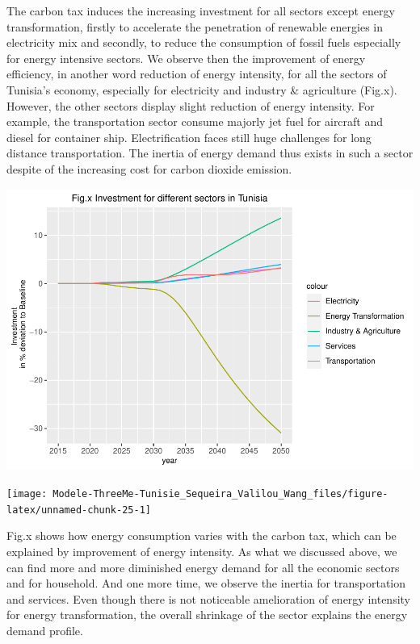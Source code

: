 \documentclass[
]{article}
\begin{document}
The carbon tax induces the increasing investment for all sectors except
energy transformation, firstly to accelerate the penetration of
renewable energies in electricity mix and secondly, to reduce the
consumption of fossil fuels especially for energy intensive sectors. We
observe then the improvement of energy efficiency, in another word
reduction of energy intensity, for all the sectors of Tunisia's economy,
especially for electricity and industry \& agriculture (Fig.x). However,
the other sectors display slight reduction of energy intensity. For
example, the transportation sector consume majorly jet fuel for aircraft
and diesel for container ship. Electrification faces still huge
challenges for long distance transportation. The inertia of energy
demand thus exists in such a sector despite of the increasing cost for
carbon dioxide emission.

\begin{center}\includegraphics[width=0.7\linewidth,height=0.7\textheight]{Modele-ThreeMe-Tunisie_Sequeira_Valilou_Wang_files/figure-latex/unnamed-chunk-24-1} \end{center}

\begin{center}\texttt{[image: Modele-ThreeMe-Tunisie\_Sequeira\_Valilou\_Wang\_files/figure-latex/unnamed-chunk-25-1]} \end{center}

Fig.x shows how energy consumption varies with the carbon tax, which can
be explained by improvement of energy intensity. As what we discussed
above, we can find more and more diminished energy demand for all the
economic sectors and for household. And one more time, we observe the
inertia for transportation and services. Even though there is not
noticeable amelioration of energy intensity for energy transformation,
the overall shrinkage of the sector explains the energy demand profile.
\end{document}
